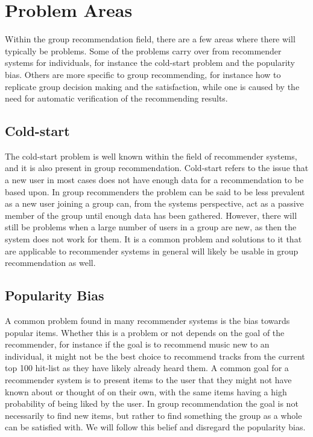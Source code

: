 \section{Problem Areas} \label{sec:problemareas}

Within the group recommendation field, there are a few areas where there will typically be problems. Some of the problems carry over from recommender systems for individuals, for instance the cold-start problem and the popularity bias. Others are more specific to group recommending, for instance how to replicate group decision making and the satisfaction, while one is caused by the need for automatic verification of the recommending results.

\subsection{Cold-start}
The cold-start problem is well known within the field of recommender systems, and it is also present in group recommendation\cite{recsyshandbookagreggation}. Cold-start refers to the issue that a new user in most cases does not have enough data for a recommendation to be based upon. In group recommenders the problem can be said to be less prevalent as a new user joining a group can, from the systems perspective, act as a passive member of the group until enough data has been gathered. However, there will still be problems when a large number of users in a group are new, as then the system does not work for them. It is a common problem and solutions to it that are applicable to recommender systems in general will likely be usable in group recommendation as well.

\subsection{Popularity Bias}
A common problem found in many recommender systems is the bias towards popular items\cite{popbias}. Whether this is a problem or not depends on the goal of the recommender, for instance if the goal is to recommend music new to an individual, it might not be the best choice to recommend tracks from the current top 100 hit-list as they have likely already heard them. A common goal for a recommender system is to present items to the user that they might not have known about or thought of on their own, with the same items having a high probability of being liked by the user. In group recommendation the goal is not necessarily to find new items, but rather to find something the group as a whole can be satisfied with. We will follow this belief and disregard the popularity bias.

